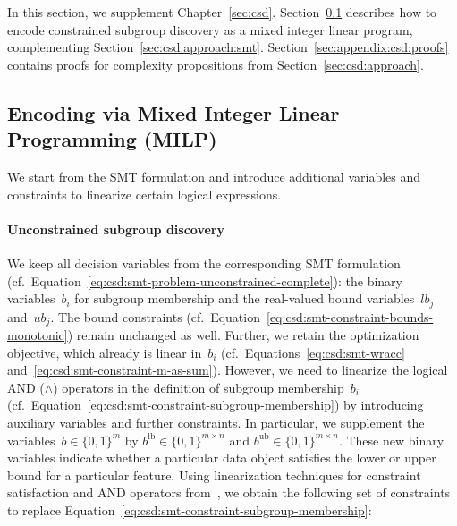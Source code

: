 In this section, we supplement Chapter~\ref{sec:csd}.
Section~\ref{sec:appendix:csd:milp-encoding} describes how to encode constrained subgroup discovery as a mixed integer linear program, complementing Section~\ref{sec:csd:approach:smt}.
Section~\ref{sec:appendix:csd:proofs} contains proofs for complexity propositions from Section~\ref{sec:csd:approach}.

\subsection{Encoding via Mixed Integer Linear Programming (MILP)}
\label{sec:appendix:csd:milp-encoding}

We start from the SMT formulation and introduce additional variables and constraints to linearize certain logical expressions.

\paragraph{Unconstrained subgroup discovery}

We keep all decision variables from the corresponding SMT formulation (cf.~Equation~\ref{eq:csd:smt-problem-unconstrained-complete}):
the binary variables~$b_i$ for subgroup membership and the real-valued bound variables~$\mathit{lb}_j$ and~$\mathit{ub}_j$.
The bound constraints (cf.~Equation~\ref{eq:csd:smt-constraint-bounds-monotonic}) remain unchanged as well.
Further, we retain the optimization objective, which already is linear in~$b_i$ (cf.~Equations~\ref{eq:csd:smt-wracc} and~\ref{eq:csd:smt-constraint-m-as-sum}).
However, we need to linearize the logical AND ($\land$) operators in the definition of subgroup membership~$b_i$ (cf.~Equation~\ref{eq:csd:smt-constraint-subgroup-membership}) by introducing auxiliary variables and further constraints.
In particular, we supplement the variables~$b \in \{0, 1\}^m$ by $b^{\text{lb}} \in \{0, 1\}^{m \times n}$ and $b^{\text{ub}} \in \{0, 1\}^{m \times n}$.
These new binary variables indicate whether a particular data object satisfies the lower or upper bound for a particular feature.
Using linearization techniques for constraint satisfaction and AND operators from~\cite{mosek2022modeling}, we obtain the following set of constraints to replace Equation~\ref{eq:csd:smt-constraint-subgroup-membership}:

